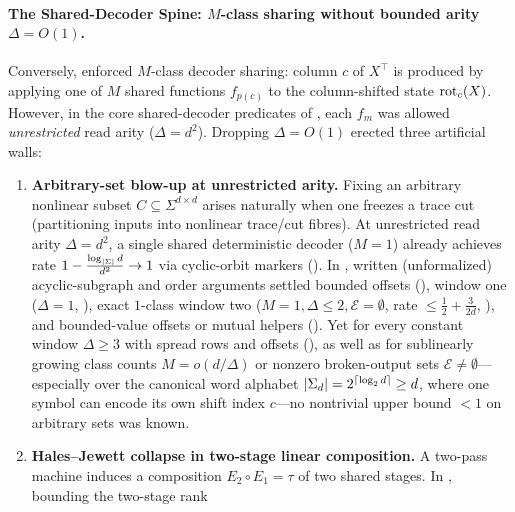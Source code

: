 \paragraph{The Shared-Decoder Spine: $M$-class sharing without bounded arity $\Delta = O(1)$.}
Conversely, \cite{SeventeenthPaper2026,SharedDecoders2026} enforced $M$-class decoder sharing:
column $c$ of $X^\top$ is produced by applying one of $M$ shared functions $f_{p(c)}$ to the
column-shifted state $\operatorname{rot}_c(X)$. However, in the core shared-decoder predicates of
\cite{SharedDecoders2026}, each $f_m$ was allowed \emph{unrestricted} read arity ($\Delta = d^2$).
Dropping $\Delta = O(1)$ erected three artificial walls:
\begin{enumerate}[label=\textbf{Wall \arabic*.},leftmargin=*]
\item \textbf{Arbitrary-set blow-up at unrestricted arity.}
  Fixing an arbitrary nonlinear subset $C \subseteq \Sigma^{d\times d}$ arises naturally when one
  freezes a trace cut (partitioning inputs into nonlinear trace/cut fibres). At unrestricted read
  arity $\Delta = d^2$, a single shared deterministic decoder ($M = 1$) already achieves rate
  $1 - \frac{\log_{\lvert \Sigma \rvert} d}{d^2} \to 1$ via cyclic-orbit markers
  (\cite[Theorem~A.1 and Corollary~A.2]{SharedDecoders2026}). In \cite[Section~6.7,
  Propositions~6.21--6.23, and Problem~9.4(b)]{SeventeenthPaper2026}, written (unformalized)
  acyclic-subgraph and order arguments settled bounded offsets (\cite[Proposition~6.21(a)]{SeventeenthPaper2026}),
  window one ($\Delta = 1$, \cite[Proposition~6.21(b)]{SeventeenthPaper2026}), exact $1$-class
  window two ($M = 1, \Delta \le 2, \mathcal{E} = \emptyset$, rate $\le \frac{1}{2} + \frac{3}{2d}$,
  \cite[Proposition~6.22(b)]{SeventeenthPaper2026}), and bounded-value offsets or mutual helpers
  (\cite[Proposition~6.22(c)--(d) and Proposition~6.23]{SeventeenthPaper2026}). Yet for every
  constant window $\Delta \ge 3$ with spread rows and offsets (\cite[Problem~9.4(b)]{SeventeenthPaper2026}),
  as well as for sublinearly growing class counts $M = o(d/\Delta)$ or nonzero broken-output sets
  $\mathcal{E} \ne \emptyset$---especially over the canonical word alphabet
  $\lvert \Sigma_d \rvert = 2^{\lceil \log_2 d \rceil} \ge d$, where one symbol can encode its own shift index $c$---no
  nontrivial upper bound $< 1$ on arbitrary sets was known.
\item \textbf{Hales--Jewett collapse in two-stage linear composition.}
  A two-pass machine induces a composition $E_2 \circ E_1 = \tau$ of two shared stages.
  In \cite[Section~6, Lemma~6.5, and Theorem~6.6]{SharedDecoders2026}, bounding the two-stage rank

\end{enumerate}
